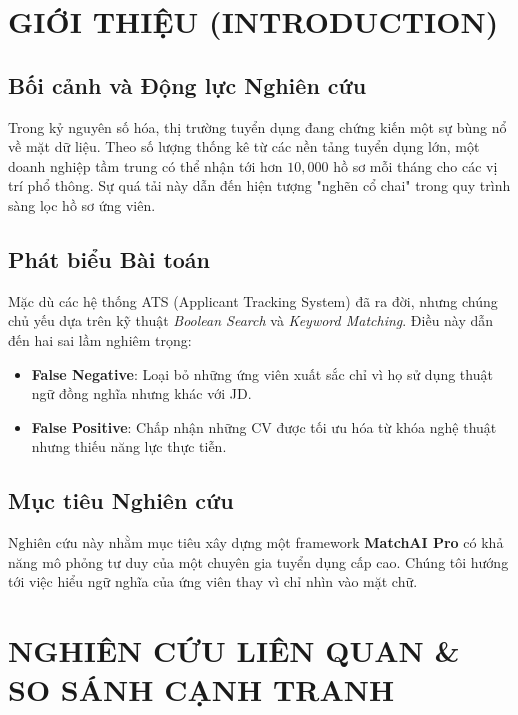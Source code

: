 \documentclass[12pt,a4paper,oneside]{report}
\begin{document}
\newpage
\tableofcontents
\newpage
\listoffigures
\listoftables

\newpage
{}


\chapter{GIỚI THIỆU (INTRODUCTION)}
\label{ch:intro}

\section{Bối cảnh và Động lực Nghiên cứu}
Trong kỷ nguyên số hóa, thị trường tuyển dụng đang chứng kiến một sự bùng nổ về mặt dữ liệu. Theo số lượng thống kê từ các nền tảng tuyển dụng lớn, một doanh nghiệp tầm trung có thể nhận tới hơn $10,000$ hồ sơ mỗi tháng cho các vị trí phổ thông. Sự quá tải này dẫn đến hiện tượng "nghẽn cổ chai" trong quy trình sàng lọc hồ sơ ứng viên.

\section{Phát biểu Bài toán}
Mặc dù các hệ thống ATS (Applicant Tracking System) đã ra đời, nhưng chúng chủ yếu dựa trên kỹ thuật \textit{Boolean Search} và \textit{Keyword Matching}. Điều này dẫn đến hai sai lầm nghiêm trọng:
\begin{itemize}
    \item \textbf{False Negative}: Loại bỏ những ứng viên xuất sắc chỉ vì họ sử dụng thuật ngữ đồng nghĩa nhưng khác với JD.
    \item \textbf{False Positive}: Chấp nhận những CV được tối ưu hóa từ khóa nghệ thuật nhưng thiếu năng lực thực tiễn.
\end{itemize}

\section{Mục tiêu Nghiên cứu}
Nghiên cứu này nhằm mục tiêu xây dựng một framework \textbf{MatchAI Pro} có khả năng mô phỏng tư duy của một chuyên gia tuyển dụng cấp cao. Chúng tôi hướng tới việc hiểu ngữ nghĩa của ứng viên thay vì chỉ nhìn vào mặt chữ.

\chapter{NGHIÊN CỨU LIÊN QUAN & SO SÁNH CẠNH TRANH}
\label{ch:related}
\end{document}
